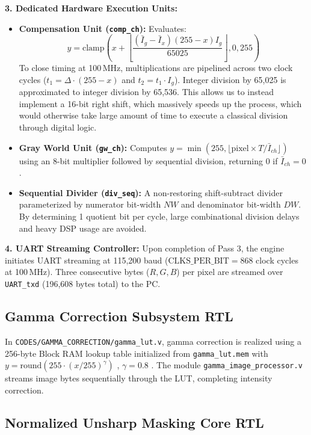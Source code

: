 \documentclass[10pt,twocolumn,letterpaper]{article}
\begin{document}
\textbf{3. Dedicated Hardware Execution Units:}
\begin{itemize}
    \item \textbf{Compensation Unit (\texttt{comp\_ch}):} Evaluates:
    \begin{equation}
      y = \text{clamp}\!\left( x + \left\lfloor\frac{(\bar{I}_g - \bar{I}_x)(255 - x)I_g}{65025}\right\rfloor, 0, 255 \right)
      \label{eq:comp_hw_cont}
    \end{equation}
    To close timing at 100\,MHz, multiplications are pipelined across two clock cycles ($t_1 = \Delta \cdot (255-x)$ and $t_2 = t_1 \cdot I_g$). Integer division by 65,025 is approximated to integer division by 65,536. This allows us to instead implement a 16-bit right shift, which massively speeds up the process, which would otherwise take large amount of time to execute a classical division through digital logic.
    \item \textbf{Gray World Unit (\texttt{gw\_ch}):} Computes $y = \min(255, \lfloor \text{pixel} \times T / \bar{I}_{ch}\rfloor)$ using an 8-bit multiplier followed by sequential division, returning 0 if $\bar{I}_{ch} = 0$.
    \item \textbf{Sequential Divider (\texttt{div\_seq}):} A non-restoring shift-subtract divider parameterized by numerator bit-width $NW$ and denominator bit-width $DW$. By determining 1 quotient bit per cycle, large combinational division delays and heavy DSP usage are avoided.
\end{itemize}

\textbf{4. UART Streaming Controller:} Upon completion of Pass 3, the engine initiates UART streaming at 115,200 baud ($\text{CLKS\_PER\_BIT} = 868$ clock cycles at 100\,MHz). Three consecutive bytes ($R, G, B$) per pixel are streamed over \texttt{UART\_txd} (196,608 bytes total) to the PC.

\subsection{Gamma Correction Subsystem RTL}
\label{subsec:gamma_rtl}

In \texttt{CODES/GAMMA\_CORRECTION/gamma\_lut.v}, gamma correction is realized using a 256-byte Block RAM lookup table initialized from \texttt{gamma\_lut.mem} with $y = \text{round}(255 \cdot (x/255)^\gamma)$ , $\gamma = 0.8$ . 
The module \texttt{gamma\_image\_processor.v} streams image bytes sequentially through the LUT, completing intensity correction.

\subsection{Normalized Unsharp Masking Core RTL}
\label{subsec:unsharp_rtl}
\end{document}
